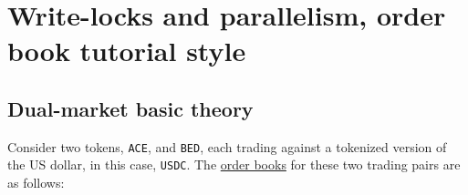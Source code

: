 \documentclass{scrartcl}
\title{\theName}
\subtitle{Hyper-parallelized on-chain order book for the Aptos blockchain}
\author{}
\date{\vspace{-55pt}} %
\def\theName{[protocol\_name]}
\begin{document}
\maketitle

\begin{abstract}

\theName\ is a fully on-chain central limit order book, built on the Aptos blockchain.
Similar in form to \href{https://docs.google.com/document/d/1isGJES4jzQutI0GtQGuqtrBUqeHxl_xJNXdtOv4SdII}{Serum}, which is built on Solana, \theName\  introduces a key technical innovation that enables parallelism within a single trading pair:
the paraqueue.
This novel feature allows \theName\ to horizontally scale high-traffic markets, thus overcoming bottlenecks that have historically limited the throughput of automated market-makers and other blockchain-based order book exchanges.
As a trustless, permissionless, decentralized protocol, built on a high-performance web-scale blockchain, \theName\ is designed for a singular purpose:
to become the world’s premier price discovery engine.

\end{abstract}

\section{Write-locks and parallelism, order book tutorial style}

\subsection{Dual-market basic theory}

Consider two tokens, \texttt{ACE}, and \texttt{BED}, each trading against a tokenized version of the US dollar, in this case, \texttt{USDC}. The \href{https://guides.cryptowat.ch/trader-education/order-books-and-market-depth-charts-explained}{order books} for these two trading pairs are as follows:

\begin{center}
\end{center}
\end{document}
